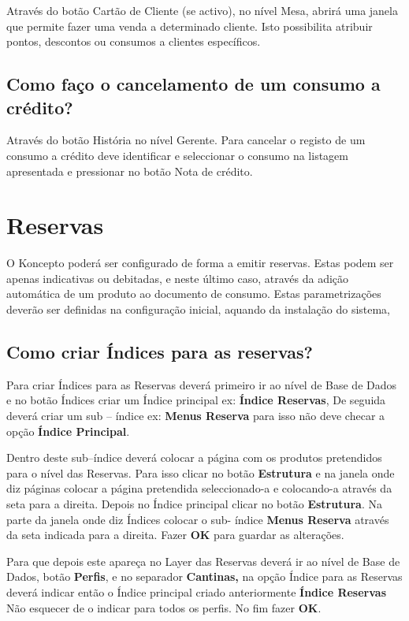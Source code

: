 \documentclass[a4paper,11pt,openany]{memoir}
\begin{document}
Através do botão Cartão de Cliente (se activo), no nível Mesa, abrirá uma janela que
permite fazer uma venda a determinado cliente. Isto possibilita atribuir pontos,
descontos ou consumos a clientes específicos.

\section{Como faço o cancelamento de um consumo a crédito?}
Através do botão História no nível Gerente. Para cancelar o registo de um consumo
a crédito deve identificar e seleccionar o consumo na listagem apresentada e
pressionar no botão Nota de crédito.

\chapter{Reservas}

O Koncepto poderá ser configurado de forma a emitir reservas. Estas podem ser
apenas indicativas ou debitadas, e neste último caso, através da adição automática
de um produto ao documento de consumo. Estas parametrizações deverão ser
definidas na configuração inicial, aquando da instalação do sistema,

\section{Como criar Índices para as reservas?}
Para criar Índices para as Reservas deverá primeiro ir ao nível de Base de Dados e
no botão Índices criar um Índice principal ex: \textbf{Índice Reservas}, De seguida deverá
criar um sub – índice ex: \textbf{Menus Reserva} para isso não deve checar a opção \textbf{Índice Principal}. 

Dentro deste sub–índice deverá colocar a página com os produtos
pretendidos para o nível das Reservas. Para isso clicar no botão \textbf{Estrutura} e na
janela onde diz páginas colocar a página pretendida seleccionado-a e colocando-a
através da seta para a direita. 
Depois no Índice principal clicar no botão \textbf{Estrutura}.
Na parte da janela onde diz Índices colocar o sub- índice \textbf{Menus Reserva} através
da seta indicada para a direita. Fazer \textbf{OK} para guardar as alterações.

Para que depois este apareça no Layer das Reservas deverá ir ao nível de Base de
Dados, botão \textbf{Perfis}, e no separador \textbf{Cantinas,} na opção Índice para as Reservas
deverá indicar então o Índice principal criado anteriormente \textbf{Índice Reservas}
Não esquecer de o indicar para todos os perfis. No fim fazer \textbf{OK}.
\end{document}

